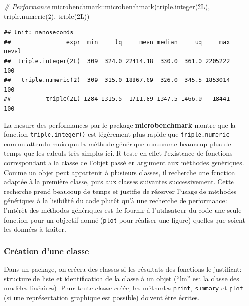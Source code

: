 \documentclass[
  11pt,
  french,
  a4paper,
  extrafontsizes,onecolumn,openright
  ]{memoir}
\newenvironment{Shaded}{\begin{snugshade}}{\end{snugshade}}
\newcommand{\CommentTok}[1]{\textcolor[rgb]{0.56,0.35,0.01}{\textit{#1}}}
\newcommand{\DecValTok}[1]{\textcolor[rgb]{0.00,0.00,0.81}{#1}}
\newcommand{\FunctionTok}[1]{\textcolor[rgb]{0.00,0.00,0.00}{#1}}
\newcommand{\NormalTok}[1]{#1}
\newcommand{\SpecialCharTok}[1]{\textcolor[rgb]{0.00,0.00,0.00}{#1}}
\begin{document}
\begin{Shaded}
\begin{Highlighting}[]
\CommentTok{\# Performance}
\NormalTok{microbenchmark}\SpecialCharTok{::}\FunctionTok{microbenchmark}\NormalTok{(}\FunctionTok{triple.integer}\NormalTok{(2L), }\FunctionTok{triple.numeric}\NormalTok{(}\DecValTok{2}\NormalTok{), }
    \FunctionTok{triple}\NormalTok{(2L))}
\end{Highlighting}
\end{Shaded}

\begin{verbatim}
## Unit: nanoseconds
##                expr  min     lq     mean median     uq     max neval
##  triple.integer(2L)  309  324.0 22414.18  330.0  361.0 2205222   100
##   triple.numeric(2)  309  315.0 18867.09  326.0  345.5 1853014   100
##          triple(2L) 1284 1315.5  1711.89 1347.5 1466.0   18441   100
\end{verbatim}

\normalsize

La mesure des performances par le package \textbf{microbenchmark} montre que la fonction \texttt{triple.integer()} est légèrement plus rapide que \texttt{triple.numeric} comme attendu mais que la méthode générique consomme beaucoup plus de temps que les calculs très simples ici.
R teste en effet l'existence de fonctions correspondant à la classe de l'objet passé en argument aux méthodes génériques.
Comme un objet peut appartenir à plusieurs classes, il recherche une fonction adaptée à la première classe, puis aux classes suivantes successivement.
Cette recherche prend beaucoup de temps et justifie de réserver l'usage de méthodes génériques à la lisibilité du code plutôt qu'à une recherche de performance: l'intérêt des méthodes génériques est de fournir à l'utilisateur du code une seule fonction pour un objectif donné (\texttt{plot} pour réaliser une figure) quelles que soient les données à traiter.

\hypertarget{cruxe9ation-dune-classe}{%
\subsubsection{Création d'une classe}\label{cruxe9ation-dune-classe}}

Dans un package, on créera des classes si les résultats des fonctions le justifient: structure de liste et identification de la classe à un objet (``lm'' est la classe des modèles linéaires).
Pour toute classe créée, les méthodes \texttt{print}, \texttt{summary} et \texttt{plot} (si une représentation graphique est possible) doivent être écrites.
\end{document}
